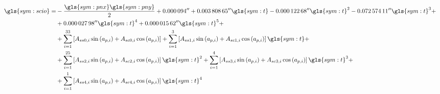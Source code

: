 \begin{align}
\notag \\
\gls{sym:scio} = &-\frac{\gls{sym:pnx}\gls{sym:pny}}{2} + \ang{;;0.000094} + \ang{;;0.00380865}\gls{sym:t} - \ang{;;0.00012268}\gls{sym:t}^2 - \ang{;;0.07257411}\gls{sym:t}^3 +
\notag \\
                 & + \ang{;;0.00002798}\gls{sym:t}^4 + \ang{;;0.00001562}\gls{sym:t}^5 + \notag \\
                 & + \sum_{i=1}^{33}\left[A_{ss0,i} \sin\left(a_{p,i}\right) + A_{sc0,i} \cos\left(a_{p,i}\right)\right] +
                     \sum_{i=1}^{3} \left[A_{ss1,i} \sin\left(a_{p,i}\right) + A_{sc1,i} \cos\left(a_{p,i}\right)\right]\gls{sym:t} + \label{eq:ssum}\\
                 & + \sum_{i=1}^{25}\left[A_{ss2,i} \sin\left(a_{p,i}\right) + A_{sc2,i} \cos\left(a_{p,i}\right)\right]\gls{sym:t}^2 + 
                     \sum_{i=1}^{4} \left[A_{ss3,i} \sin\left(a_{p,i}\right) + A_{sc3,i} \cos\left(a_{p,i}\right)\right]\gls{sym:t}^3 + \notag \\
                 & + \sum_{i=1}^{1} \left[A_{ss4,i} \sin\left(a_{p,i}\right) + A_{sc4,i} \cos\left(a_{p,i}\right)\right]\gls{sym:t}^4 \notag
                    \end{align}

